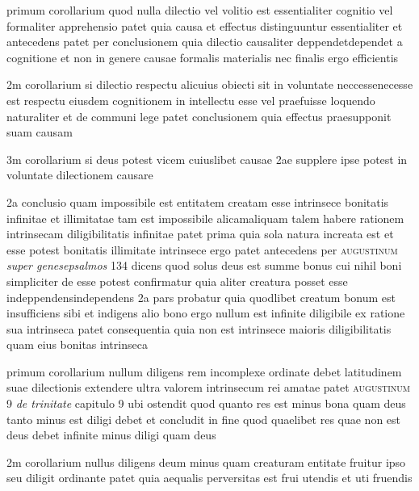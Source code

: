 \documentclass[twoside, openright]{article}
\newcommand{\name}[1]{\textsc{#1}}
\newcommand{\worktitle}[1]{\textit{#1}}
\begin{document}
        \pstart
        primum corollarium quod nulla dilectio vel volitio est essentialiter cognitio vel formaliter apprehensio patet quia causa et effectus distinguuntur essentialiter et antecedens patet per conclusionem quia dilectio causaliter deppendetdependet a cognitione et non in genere causae formalis materialis nec finalis ergo efficientis
        \pend
     
        \pstart
        2m corollarium si dilectio respectu alicuius obiecti sit in voluntate neccessenecesse est respectu eiusdem cognitionem in intellectu esse vel praefuisse loquendo naturaliter et de communi lege patet   conclusionem quia effectus praesupponit suam causam
        \pend
     
        \pstart
        3m corollarium si deus potest vicem cuiuslibet causae 2ae supplere ipse potest in voluntate dilectionem causare
        \pend
     
        \pstart
        2a conclusio quam impossibile est entitatem creatam esse intrinsece bonitatis infinitae et illimitatae tam est impossibile alicamaliquam talem habere rationem intrinsecam diligibilitatis infinitae patet prima quia sola natura increata est et esse potest bonitatis illimitate intrinsece ergo patet antecedens per \name{augustinum} \worktitle{super genesepsalmos}\index[works]{} 134 dicens quod solus deus est summe bonus cui nihil boni simpliciter de esse potest  confirmatur quia aliter creatura posset esse indeppendensindependens 2a pars probatur quia quodlibet creatum bonum est insufficiens sibi et indigens alio bono ergo nullum est infinite diligibile ex ratione sua intrinseca patet consequentia quia non est intrinsece maioris diligibilitatis quam eius bonitas intrinseca
        \pend
     
        \pstart
        primum corollarium nullum diligens rem incomplexe ordinate debet latitudinem suae dilectionis extendere ultra valorem intrinsecum rei amatae patet  \name{augustinum} 9 \worktitle{de trinitate} capitulo 9 ubi ostendit quod quanto res est minus bona quam deus tanto minus est diligi debet et concludit in fine quod quaelibet res quae non est deus debet infinite minus diligi quam deus
        \pend
     
        \pstart
        2m corollarium nullus diligens deum minus quam creaturam entitate fruitur ipso seu diligit ordinante patet quia aequalis perversitas est frui utendis et uti fruendis
        \pend
     
\end{document}
